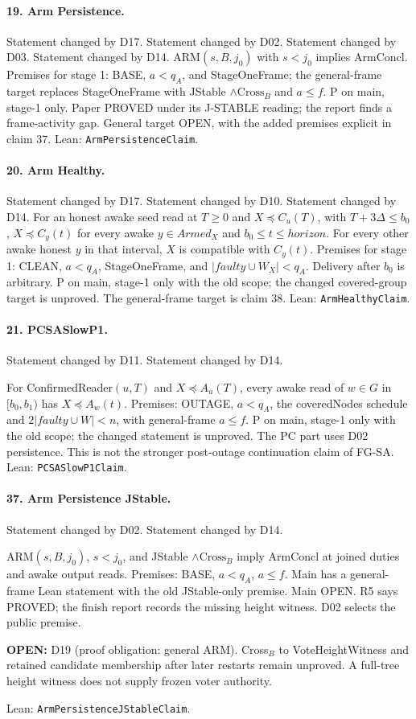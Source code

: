 \documentclass{article}
\newcommand{\OPEN}[1]{\par\noindent\textbf{OPEN:} #1\par}
\newcommand{\nm}[1]{\nolinkurl{#1}}
\begin{document}
\paragraph{19. Arm Persistence.}
Statement changed by D17.
Statement changed by D02. Statement changed by D03. Statement changed by D14.
ARM$(s,B,j_0)$ with $s<j_0$ implies ArmConcl. Premises for stage 1: BASE, $a<q_A$, and StageOneFrame; the general-frame target replaces StageOneFrame with JStable $\wedge\mathrm{Cross}_B$ and $a\leq f$. P on main, stage-1 only. Paper PROVED under its J-STABLE reading; the report finds a frame-activity gap. General target OPEN, with the added premises explicit in claim 37.
Lean: \nm{ArmPersistenceClaim}.

\paragraph{20. Arm Healthy.}
Statement changed by D17.
Statement changed by D10. Statement changed by D14.
For an honest awake seed read at $T\geq0$ and $X\preceq C_u(T)$, with $T+3\Delta\leq b_0$, $X\preceq C_y(t)$ for every awake $y\in\mathit{Armed}_X$ and $b_0\leq t\leq\mathit{horizon}$. For every other awake honest $y$ in that interval, $X$ is compatible with $C_y(t)$. Premises for stage 1: CLEAN, $a<q_A$, StageOneFrame, and $|\mathit{faulty}\cup W_X|<q_A$. Delivery after $b_0$ is arbitrary. P on main, stage-1 only with the old scope; the changed covered-group target is unproved. The general-frame target is claim 38.
Lean: \nm{ArmHealthyClaim}.

\paragraph{21. PCSASlowP1.}
Statement changed by D11. Statement changed by D14.\par
For ConfirmedReader$(u,T)$ and $X\preceq A_u(T)$, every awake read of $w\in G$ in $[b_0,b_1)$ has $X\preceq A_w(t)$. Premises: OUTAGE, $a<q_A$, the coveredNodes schedule and $2|\mathit{faulty}\cup W|<n$, with general-frame $a\leq f$. P on main, stage-1 only with the old scope; the changed statement is unproved. The PC part uses D02 persistence. This is not the stronger post-outage continuation claim of FG-SA.
Lean: \nm{PCSASlowP1Claim}.

\paragraph{37. Arm Persistence JStable.}
Statement changed by D02. Statement changed by D14.\par
ARM$(s,B,j_0)$, $s<j_0$, and JStable $\wedge\mathrm{Cross}_B$ imply ArmConcl at joined duties and awake output reads. Premises: BASE, $a<q_A$, $a\leq f$. Main has a general-frame Lean statement with the old JStable-only premise. Main OPEN. R5 says PROVED; the finish report records the missing height witness. D02 selects the public premise.
\OPEN{D19 (proof obligation: general ARM). Cross$_B$ to VoteHeightWitness
and retained candidate membership after later restarts remain unproved.
A full-tree height witness does not supply frozen voter authority.}
Lean: \nm{ArmPersistenceJStableClaim}.
\end{document}
